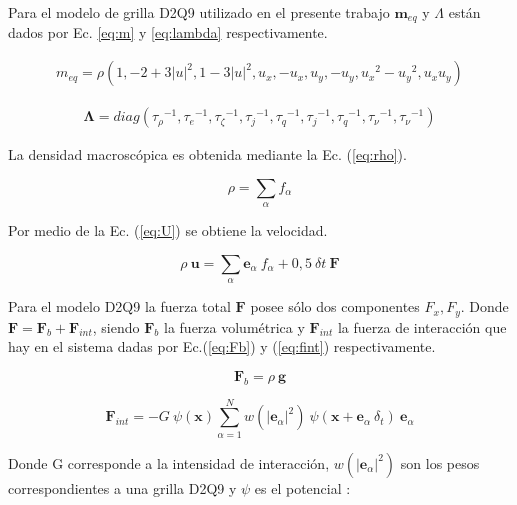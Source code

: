 Para el modelo de grilla D2Q9 utilizado en el presente trabajo $\mathbf{m}_{eq}$ y $ \Lambda$ están dados por Ec. \ref{eq:m} y \ref{eq:lambda} respectivamente.

\begin{align}
m_{eq} =  \rho  \left( 1, - 2 + 3 {|u|}^{2} , 1 - 3{|u|}^{2} , u_{x} , - u_{x} , u_{y} , - u_{y} , {u_{x}}^{2} - {u_{y}}^{2} , u_{x} u_{y} \right) 
\label{eq:m}
\end{align}

    
\begin{align}
    \mathbf{\Lambda}  = diag ( {\tau_{\rho }}^{-1},{\tau_{e}}^{-1},{\tau_{\zeta }}^{-1},{\tau_{j}}^{-1},{\tau_{q}}^{-1},{\tau_{j}}^{-1},{\tau_{q}}^{-1},{\tau_{\nu }}^{-1},{\tau_{\nu}}^{-1}) 
    \label{eq:lambda}
\end{align}


La densidad macroscópica es obtenida mediante la Ec. (\ref{eq:rho}).

\begin{equation}
        \rho = \sum_{\alpha} f_{\alpha}
        \label{eq:rho}
\end{equation}

Por medio de la Ec. (\ref{eq:U}) se obtiene la velocidad.

\begin{equation}
    \rho \> \mathbf{u} = \sum_{\alpha} {\mathbf{e}}_{\alpha} \> f_{\alpha} + 0,5 \> {\delta}{t} \> \mathbf{F}
    \label{eq:U}
\end{equation}

Para el modelo D2Q9 la fuerza total $\mathbf{F}$ posee sólo dos componentes $F_{x} , F_{y}$. Donde $ {\mathbf{F}} = {\mathbf{F}}_{b} + {\mathbf{F}}_{int} $, siendo ${\mathbf{F}}_{b}$ la fuerza volumétrica y ${\mathbf{F}}_{int}$ la fuerza de interacción que hay en el sistema dadas por Ec.(\ref{eq:Fb}) y (\ref{eq:fint}) respectivamente.

\begin{equation}
	{\mathbf{F}}_{b} = \rho \> \mathbf{g}
	\label{eq:Fb}
\end{equation}


\begin{equation}
{\mathbf{F}}_{int} = - G \> \psi(\mathbf{x}) \sum_{\alpha=1}^{N} w({|{\mathbf{e}}_{\alpha}|}^{2}) \> \psi (\mathbf{x} + {\mathbf{e}}_{\alpha} \> \delta_{t}) \> {\mathbf{e}}_{\alpha} 
\label{eq:fint}
\end{equation}

Donde G corresponde a la intensidad de interacción, $w({|{\mathbf{e}}_{\alpha}|}^{2})$ son los pesos correspondientes a una grilla D2Q9 y $\psi$ es el potencial :

